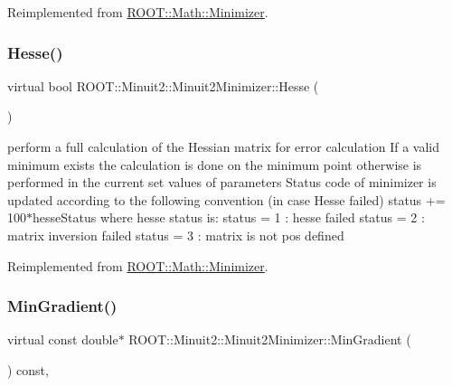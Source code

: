 Reimplemented from \mbox{\hyperlink{classROOT_1_1Math_1_1Minimizer_ae903e5936bef4ea7fac3301f9cdc50be}{R\+O\+O\+T\+::\+Math\+::\+Minimizer}}.

\mbox{\label{classROOT_1_1Minuit2_1_1Minuit2Minimizer_a0cfd04fde73c157de423705625ede51c}} 
\subsubsection{\texorpdfstring{Hesse()}{Hesse()}\hspace{0.1cm}{\footnotesize\ttfamily [2/2]}}
{\footnotesize\ttfamily virtual bool R\+O\+O\+T\+::\+Minuit2\+::\+Minuit2\+Minimizer\+::\+Hesse (\begin{DoxyParamCaption}{ }\end{DoxyParamCaption})\hspace{0.3cm}{\ttfamily [virtual]}}

perform a full calculation of the Hessian matrix for error calculation If a valid minimum exists the calculation is done on the minimum point otherwise is performed in the current set values of parameters Status code of minimizer is updated according to the following convention (in case Hesse failed) status += 100$\ast$hesse\+Status where hesse status is\+: status = 1 \+: hesse failed status = 2 \+: matrix inversion failed status = 3 \+: matrix is not pos defined 

Reimplemented from \mbox{\hyperlink{classROOT_1_1Math_1_1Minimizer_ae903e5936bef4ea7fac3301f9cdc50be}{R\+O\+O\+T\+::\+Math\+::\+Minimizer}}.

\mbox{\label{classROOT_1_1Minuit2_1_1Minuit2Minimizer_a52c6b3a13108b64366b1acd43f7e2b9a}} 
\subsubsection{\texorpdfstring{MinGradient()}{MinGradient()}\hspace{0.1cm}{\footnotesize\ttfamily [1/2]}}
{\footnotesize\ttfamily virtual const double$\ast$ R\+O\+O\+T\+::\+Minuit2\+::\+Minuit2\+Minimizer\+::\+Min\+Gradient (\begin{DoxyParamCaption}{ }\end{DoxyParamCaption}) const\hspace{0.3cm}{\ttfamily [inline]}, {\ttfamily [virtual]}}



